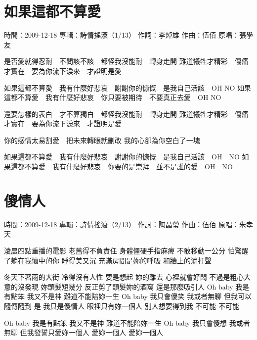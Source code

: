 \documentclass[UTF8,a4paper,oneside,twocolumn,12pt]{ctexbook}
\newcommand{\infopair}[2]{\textbullet #1：#2}
\newcommand{\zc}[1][伍佰]{\infopair{作詞}{#1}}
\newcommand{\zq}[1][伍佰]{\infopair{作曲}{#1}}
\newcommand{\zj}[1]{\infopair{專輯}{#1}}
\newcommand{\yc}[1]{\infopair{原唱}{#1}}
\newcommand{\sj}[1]{\infopair{時間}{#1}}
\newenvironment{info}{\begin{flushleft}\kaishu
	}
	{\end{flushleft}\normalsize\yahei\par}
\newenvironment{lyric}{
	}
{}
\begin{document}
\section{如果這都不算愛}
\begin{info}
	\sj{2009-12-18}
	\zj{詩情搖滾（1/13）}
	\zc[李焯雄]
	\zq
	\yc{張學友}
\end{info}
\begin{lyric}
	是否愛就得忍耐　不問該不該　都怪我沒能耐　轉身走開
	難道犧牲才精彩　傷痛才實在　要為你流下淚來　才證明是愛

	如果這都不算愛　我有什麼好悲哀　謝謝你的慷慨　是我自己活該　OH NO
	如果這都不算愛　我有什麼好悲哀　你只要被期待　不要真正去愛　OH NO

	還要怎樣的表白　才不算獨白　都怪我沒能耐　轉身走開
	難道犧牲才精彩　傷痛才實在　要為你流下淚來　才證明是愛

	你的感情太易割愛　把未來轉眼就刪改
	我的心卻為你空白了一塊

	如果這都不算愛　我有什麼好悲哀　謝謝你的慷慨　是我自己活該　OH　NO
	如果這都不算愛　我有什麼好悲哀　你要的是崇拜　並不是誰的愛　OH　NO
\end{lyric}

\section{傻情人}
\begin{info}
	\sj{2009-12-18}
	\zj{詩情搖滾（2/13）}
	\zc[陶晶瑩]
	\zq
	\yc{朱孝天}
\end{info}
\begin{lyric}
	淩晨四點重播的電影 老舊得不負責任
	身體僵硬手指麻痺 不敢移動一公分
	怕驚醒了躺在我懷中的你 睡得美又沉
	充滿房間是妳的呼吸 和牆上的滴打聲

	冬天下著雨的大街 冷得沒有人性
	要是想起 妳的離去 心裡就會好悶
	不過是粗心大意的沒發現 妳頭髮短幾分
	反正剪了頭髮妳的酒窩 還是那麼吸引人
	Oh baby 我是有點笨 我又不是神
	難道不能陪妳一生
	Oh baby 我只會傻笑 我或者無聊
	但我可以隨傳隨到
	是 我只是傻情人 眼裡只有妳一個人
	別人想要得到我 不可能 不可能

	Oh baby 我是有點笨 我又不是神
	難道不能陪妳一生
	Oh baby 我只會傻想 我或者無聊
	但我發誓只愛妳一個人 愛妳一個人 愛妳一個人
\end{lyric}
\end{document}
